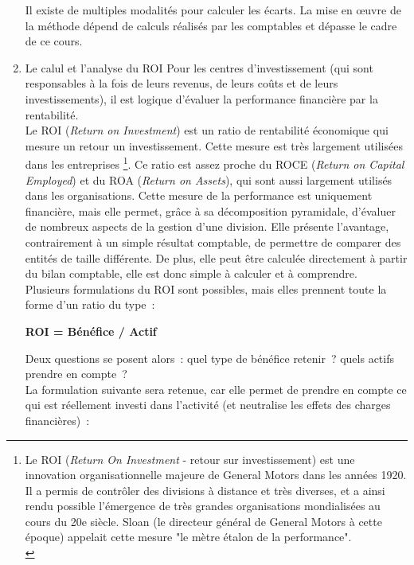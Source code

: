 \documentclass{tufte-handout}
\begin{document}
\begin{enumerate}
\begin{warning}
Il existe de multiples modalités pour calculer les écarts. La mise en œuvre de la méthode dépend de calculs réalisés par les comptables et dépasse le cadre de ce cours.\\
\end{warning}
\item Le calul et l'analyse du ROI
\label{sec:org6632370}
Pour les centres d'investissement (qui sont responsables à la fois de leurs revenus, de leurs coûts et de leurs investissements), il est logique d'évaluer la performance financière par la rentabilité.\\
Le ROI (\emph{Return on Investment}) est un ratio de rentabilité économique qui mesure un retour un investissement. Cette mesure est très largement utilisées dans les entreprises \footnote{Le ROI (\emph{Return On Investment} - retour sur investissement) est une innovation organisationnelle majeure de General Motors dans les années 1920. Il a permis de contrôler des divisions à distance et très diverses, et a ainsi rendu possible l'émergence de très grandes organisations mondialisées au cours du 20e siècle. Sloan (le directeur général de General Motors à cette époque) appelait cette mesure "le mètre étalon de la performance".\\}. Ce ratio est assez proche du ROCE (\emph{Return on Capital Employed}) et du ROA (\emph{Return on Assets}), qui sont aussi largement utilisés dans les organisations. Cette mesure de la performance est uniquement financière, mais elle permet, grâce à sa décomposition pyramidale, d'évaluer de nombreux aspects de la gestion d'une division. Elle présente l'avantage, contrairement à un simple résultat comptable, de permettre de comparer des entités de taille différente. De plus, elle peut être calculée directement à partir du bilan comptable, elle est donc simple à calculer et à comprendre.\\
Plusieurs formulations du ROI sont possibles, mais elles prennent toute la forme d'un ratio du type :\\
\begin{center}
\textbf{ROI = Bénéfice / Actif}\\
\end{center}
Deux questions se posent alors : quel type de bénéfice retenir ? quels actifs prendre en compte ?\\
La formulation suivante sera retenue, car elle permet de prendre en compte ce qui est réellement investi dans l'activité (et neutralise les effets des charges financières) :\\

\end{enumerate}
\end{document}
